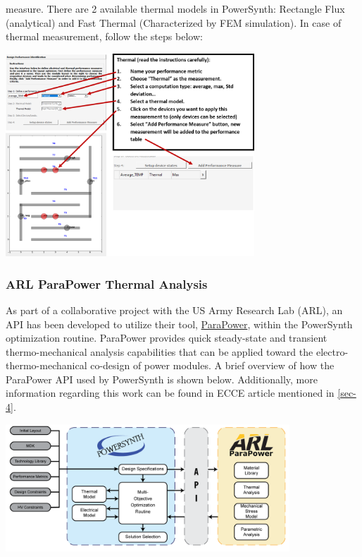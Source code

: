\documentclass[11pt]{article}
\begin{document}
 measure. There are 2 available thermal models in PowerSynth: Rectangle Flux (analytical) and Fast Thermal (Characterized by FEM simulation). In case of thermal measurement, follow the steps below:

\begin{center}
\includegraphics[width=0.7\textwidth]{./figs/17_thermal.png}
\end{center}

\subsubsection{ARL ParaPower Thermal Analysis}
\label{parapower}

As part of a collaborative project with the US Army Research Lab (ARL), an API has been developed to utilize their tool, \href{https://github.com/USArmyResearchLab/ParaPower}{ParaPower}, within the PowerSynth optimization routine. ParaPower provides quick steady-state and transient thermo-mechanical analysis capabilities that can be applied toward the electro-thermo-mechanical co-design of power modules. A brief overview of how the ParaPower API used by PowerSynth is shown below. Additionally, more information regarding this work can be found in ECCE article mentioned in \ref{sec-4}.

\begin{center}
\includegraphics[width=0.8\textwidth]{./figs/ParaPower/CODESIGN_r1-01.png}
\end{center}
\end{document}
